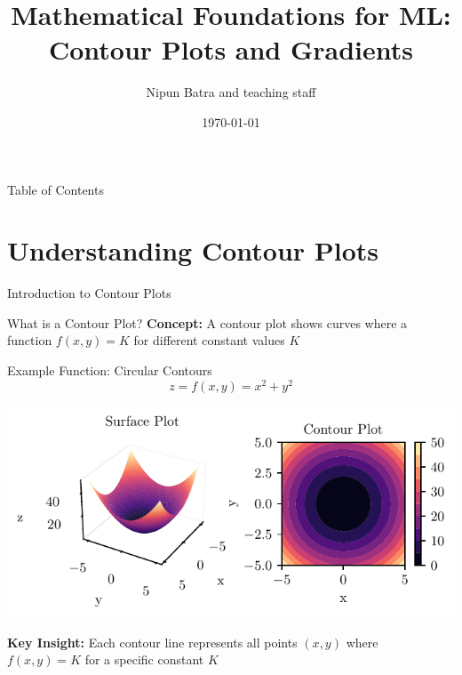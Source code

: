 \documentclass[10pt]{beamer}
\title{Mathematical Foundations for ML: Contour Plots and Gradients}
\date{\today}
\author{Nipun Batra and teaching staff}
\institute{IIT Gandhinagar}
\newcommand{\fitpic}[1]{\begin{adjustbox}{max width=\linewidth, max totalheight=0.78\textheight}#1\end{adjustbox}}
\begin{document}
\maketitle

\begin{frame}{Table of Contents}
\tableofcontents
\end{frame}

\section{Understanding Contour Plots}



\begin{frame}{Introduction to Contour Plots}
\begin{definitionbox}{What is a Contour Plot?}
\textbf{Concept:} A contour plot shows curves where a function $f(x,y) = K$ for different constant values $K$
\end{definitionbox}

\begin{examplebox}{Example Function: Circular Contours}
$$z = f(x,y) = x^{2} + y^{2}$$
\end{examplebox}

\begin{center}
\fitpic{\includegraphics[width=0.8\linewidth]{../assets/mathematical-ml/figures/contour-x_squared_plus_y_squared.pdf}}
\end{center}

\begin{keypointsbox}
\textbf{Key Insight:} Each contour line represents all points $(x,y)$ where $f(x,y) = K$ for a specific constant $K$
\end{keypointsbox}
\end{frame}
\end{document}
